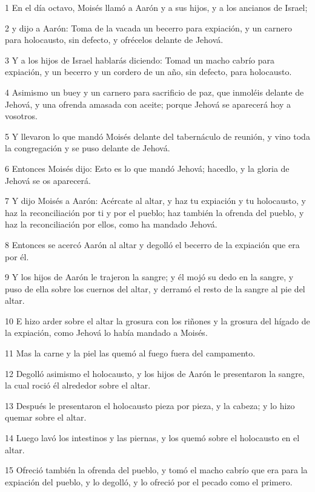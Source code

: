 \par 1 En el día octavo, Moisés llamó a Aarón y a sus hijos, y a los ancianos de Israel;
\par 2 y dijo a Aarón: Toma de la vacada un becerro para expiación, y un carnero para holocausto, sin defecto, y ofrécelos delante de Jehová.
\par 3 Y a los hijos de Israel hablarás diciendo: Tomad un macho cabrío para expiación, y un becerro y un cordero de un año, sin defecto, para holocausto.
\par 4 Asimismo un buey y un carnero para sacrificio de paz, que inmoléis delante de Jehová, y una ofrenda amasada con aceite; porque Jehová se aparecerá hoy a vosotros.
\par 5 Y llevaron lo que mandó Moisés delante del tabernáculo de reunión, y vino toda la congregación y se puso delante de Jehová.
\par 6 Entonces Moisés dijo: Esto es lo que mandó Jehová; hacedlo, y la gloria de Jehová se os aparecerá.
\par 7 Y dijo Moisés a Aarón: Acércate al altar, y haz tu expiación y tu holocausto, y haz la reconciliación por ti y por el pueblo; haz también la ofrenda del pueblo, y haz la reconciliación por ellos, como ha mandado Jehová.
\par 8 Entonces se acercó Aarón al altar y degolló el becerro de la expiación que era por él.
\par 9 Y los hijos de Aarón le trajeron la sangre; y él mojó su dedo en la sangre, y puso de ella sobre los cuernos del altar, y derramó el resto de la sangre al pie del altar.
\par 10 E hizo arder sobre el altar la grosura con los riñones y la grosura del hígado de la expiación, como Jehová lo había mandado a Moisés.
\par 11 Mas la carne y la piel las quemó al fuego fuera del campamento.
\par 12 Degolló asimismo el holocausto, y los hijos de Aarón le presentaron la sangre, la cual roció él alrededor sobre el altar.
\par 13 Después le presentaron el holocausto pieza por pieza, y la cabeza; y lo hizo quemar sobre el altar.
\par 14 Luego lavó los intestinos y las piernas, y los quemó sobre el holocausto en el altar.
\par 15 Ofreció también la ofrenda del pueblo, y tomó el macho cabrío que era para la expiación del pueblo, y lo degolló, y lo ofreció por el pecado como el primero.
